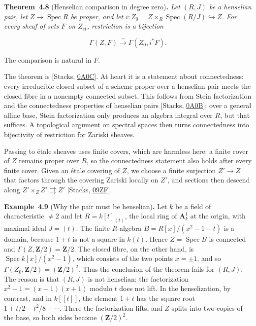 \documentclass[11pt]{article}
\newenvironment{bpstatement}[2]{\par\addvspace{0.6\baselineskip}\noindent\textbf{#1}#2\textbf{.}\enspace\ignorespaces}
  {\par\addvspace{0.4\baselineskip}}
\newenvironment{bpstatementit}[2]{\begin{bpstatement}{#1}{#2}\itshape\ignorespaces}{\end{bpstatement}}
\begin{document}
\label{bp24}%
\begin{bpstatementit}{Theorem~4.8}{ (Henselian comparison in degree zero)}
Let \((R,J)\) be a henselian pair, let \(Z\to\operatorname{Spec}R\) be proper, and let \(i:Z_0=Z\times_R\operatorname{Spec}(R/J)\hookrightarrow Z\). For every sheaf of sets \(F\) on \(Z_{\acute{e}t}\), restriction is a bijection

\[
\Gamma(Z,F)\xrightarrow{\sim}\Gamma(Z_0,i^*F).
\]

The comparison is natural in \(F\).
\end{bpstatementit}

\label{bp25}%
The theorem is [Stacks, \href{https://stacks.math.columbia.edu/tag/0A0C}{0A0C}]. At heart it is a statement about connectedness: every irreducible closed subset of a scheme proper over a henselian pair meets the closed fibre in a nonempty connected subset. This follows from Stein factorization and the connectedness properties of henselian pairs [Stacks, \href{https://stacks.math.columbia.edu/tag/0A0B}{0A0B}]; over a general affine base, Stein factorization only produces an algebra integral over \(R\), but that suffices. A topological argument on spectral spaces then turns connectedness into bijectivity of restriction for Zariski sheaves.

Passing to étale sheaves uses finite covers, which are harmless here: a finite cover of \(Z\) remains proper over \(R\), so the connectedness statement also holds after every finite cover. Given an étale covering of \(Z\), we choose a finite surjection \(Z'\to Z\) that factors through the covering Zariski locally on \(Z'\), and sections then descend along \(Z'\times_ZZ'\rightrightarrows Z'\) [Stacks, \href{https://stacks.math.columbia.edu/tag/09ZF}{09ZF}].

\label{bp26}%
\begin{bpstatement}{Example~4.9}{ (Why the pair must be henselian)}
Let \(k\) be a field of characteristic \(\neq2\) and let \(R=k[t]_{(t)}\), the local ring of \(\mathbf A^1_k\) at the origin, with maximal ideal \(J=(t)\). The finite \(R\)-algebra \(B=R[x]/(x^2-1-t)\) is a domain, because \(1+t\) is not a square in \(k(t)\). Hence \(Z=\operatorname{Spec}B\) is connected and \(\Gamma(Z,\mathbf Z/2)=\mathbf Z/2\). The closed fibre, on the other hand, is \(\operatorname{Spec}k[x]/(x^2-1)\), which consists of the two points \(x=\pm1\), and so \(\Gamma(Z_0,\mathbf Z/2)=(\mathbf Z/2)^2\). Thus the conclusion of the theorem fails for \((R,J)\). The reason is that \((R,J)\) is not henselian: the factorization \(x^2-1=(x-1)(x+1)\) modulo \(t\) does not lift. In the henselization, by contrast, and in \(k[[t]]\), the element \(1+t\) has the square root \(1+t/2-t^2/8+\cdots\). There the factorization lifts, and \(Z\) splits into two copies of the base, so both sides become \((\mathbf Z/2)^2\).
\end{bpstatement}
\end{document}
